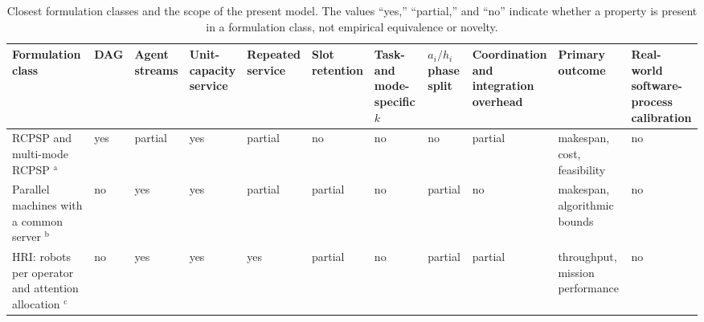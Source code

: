 \begin{landscape}
\begin{table}[!ht]
\centering
\caption{Closest formulation classes and the scope of the present model. The
values ``yes,'' ``partial,'' and ``no'' indicate whether a property is present
in a formulation class, not empirical equivalence or novelty.}
\label{tab:closest-prior-work}
\setlength{\tabcolsep}{1.1pt}
\renewcommand{\arraystretch}{1.18}
\renewcommand{\textsuperscript}[1]{\ensuremath{^{\mathrm{#1}}}}
\scriptsize
\begin{tabular}{>{\raggedright\arraybackslash}p{2.85cm}>{\centering\arraybackslash}p{1.45cm}>{\centering\arraybackslash}p{1.9cm}>{\centering\arraybackslash}p{1.65cm}>{\centering\arraybackslash}p{1.7cm}>{\centering\arraybackslash}p{1.6cm}>{\centering\arraybackslash}p{1.45cm}>{\centering\arraybackslash}p{1.55cm}>{\centering\arraybackslash}p{1.95cm}>{\raggedright\arraybackslash}p{2.6cm}>{\raggedright\arraybackslash}p{4.15cm}}
\toprule
Formulation class & DAG & \shortstack{Agent\\streams} & \shortstack{Unit-\\capacity\\service} & \shortstack{Repeated\\service} & \shortstack{Slot\\retention} & \shortstack{Task-\\and mode-\\specific $k$} & \shortstack{$a_i/h_i$\\phase split} & \shortstack{Coordination\\and\\integration\\overhead} & \shortstack{Primary\\outcome} & \shortstack{Real-world\\software-process\\calibration} \\
\midrule
RCPSP and multi-mode RCPSP \cite{brucker1999resource}\textsuperscript{a}
& yes & partial & yes & partial & no & no & no & partial & makespan, cost, feasibility & no \\

Parallel machines with a common server \cite{hall2000parallel,kravchenko1997parallel,elidrissi2023loading,chakhlevitch2009reentrant}\textsuperscript{b}
& no & yes & yes & partial & partial & no & partial & no & makespan, algorithmic bounds & no \\

HRI: robots per operator and attention allocation \cite{olsen2004fanout,crandall2005validating,crandall2011computing,cummings2008predicting}\textsuperscript{c}
& no & yes & yes & yes & partial & no & partial & partial & throughput, mission performance & no \\


\end{tabular}
\end{table}
\end{landscape}
